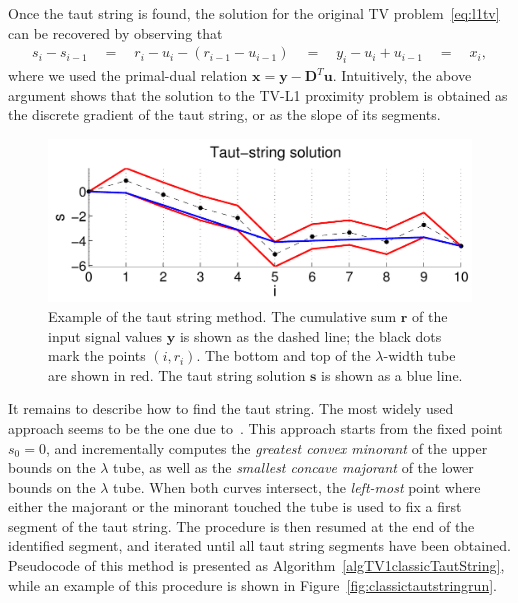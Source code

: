 \documentclass[twoside,11pt]{article}
\newcommand{\vr}{\bm{r}}       \newcommand{\vrh}{\hat{\bm{r}}}        \newcommand{\rh}{\hat{r}}    \newcommand{\vrt}{\tilde{\bm{r}}}       \newcommand{\rt}{\tilde{r}}
\newcommand{\vs}{\bm{s}}       \newcommand{\vsh}{\hat{\bm{s}}}        \newcommand{\sh}{\hat{s}}    \newcommand{\vst}{\tilde{\bm{s}}}       \newcommand{\st}{\tilde{s}}
\newcommand{\vu}{\bm{u}}       \newcommand{\vuh}{\hat{\bm{u}}}        \newcommand{\uh}{\hat{u}}    \newcommand{\vut}{\tilde{\bm{u}}}       \newcommand{\ut}{\tilde{u}}
\newcommand{\vx}{\bm{x}}       \newcommand{\vxh}{\hat{\bm{x}}}        \newcommand{\xh}{\hat{x}}    \newcommand{\vxt}{\tilde{\bm{x}}}       \newcommand{\xt}{\tilde{x}}
\newcommand{\vy}{\bm{y}}       \newcommand{\vyh}{\hat{\bm{y}}}        \newcommand{\yh}{\hat{y}}    \newcommand{\vyt}{\tilde{\bm{y}}}       \newcommand{\yt}{\tilde{y}}
\newcommand{\md}{\bm{D}}
\numberwithin{equation}{section}
\numberwithin{theorem}{section}
\begin{document}
Once the taut string is found, the solution for the original TV problem~\eqref{eq:l1tv} can be recovered by observing that
\begin{align*}
 s_i - s_{i-1}\quad=\quad r_i - u_i - (r_{i-1} - u_{i-1})\quad=\quad y_i - u_i + u_{i-1}\quad=\quad x_i,
\end{align*}
where we used the primal-dual relation $\vx = \vy - \md^T \vu$. Intuitively, the above argument shows that the solution to the TV-L1 proximity problem is obtained as the discrete gradient of the taut string, or as the slope of its segments.

\begin{figure}[t]
  \centering
  \includegraphics[width = \textwidth]{tautStringExample}
  \caption{\small Example of the taut string method. The cumulative sum $\vr$ of the input signal values $\vy$ is shown as the dashed line; the black dots mark the points $(i,r_i)$. The bottom and top of the $\lambda$-width tube are shown in red. The taut string solution $\vs$ is shown as a blue line.
   }   \label{fig:tautStringExample}
\end{figure}

It remains to describe how to find the taut string. The most widely used approach seems to be the one due to~\citet{daviesTautString}. This approach starts from the fixed point $s_0 = 0$, and incrementally computes the \emph{greatest convex minorant} of the upper bounds on the $\lambda$ tube, as well as the \emph{smallest concave majorant} of the lower bounds on the $\lambda$ tube. When both curves intersect, the \emph{left-most} point where either the majorant or the minorant touched the tube is used to fix a first segment of the taut string. The procedure is then resumed at the end of the identified segment, and iterated until all taut string segments have been obtained. Pseudocode of this method is presented as Algorithm~\ref{algTV1classicTautString}, while an example of this procedure is shown in Figure~\ref{fig:classictautstringrun}.
\end{document}
